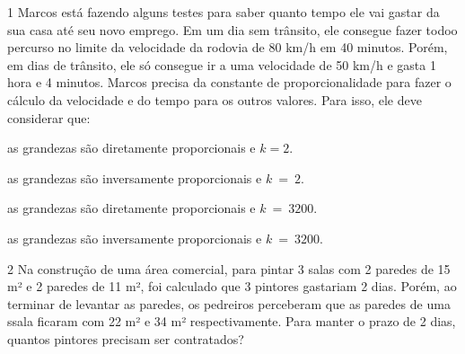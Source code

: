 \num{1} Marcos está fazendo alguns testes para saber quanto tempo ele vai
gastar da sua casa até seu novo emprego. Em um dia sem trânsito, ele
consegue fazer todoo percurso no limite da velocidade da rodovia de 80
km/h em 40 minutos. Porém, em dias de trânsito, ele só consegue ir a uma
velocidade de 50 km/h e gasta 1 hora e 4 minutos. Marcos precisa da
constante de proporcionalidade para fazer o cálculo da velocidade e do
tempo para os outros valores. Para isso, ele deve considerar que:

\begin{escolha}
\item as grandezas são diretamente proporcionais e $k  =  2$.
\item as grandezas são inversamente proporcionais e $k\  = \ 2$.
\item as grandezas são diretamente proporcionais e $k\  = \ 3200$.
\item as grandezas são inversamente proporcionais e $k\  = \ 3200$.
\end{escolha}



\num{2} Na construção de uma área comercial, para pintar 3 salas com 2
paredes de 15 m² e 2 paredes de 11 m², foi calculado que 3 pintores
gastariam 2 dias. Porém, ao terminar de levantar as paredes, os
pedreiros perceberam que as paredes de uma ssala ficaram com 22 m² e 34
m² respectivamente. Para manter o prazo de 2 dias, quantos pintores
precisam ser contratados?

